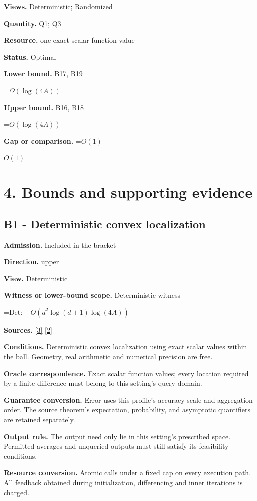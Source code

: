 \documentclass[10pt,a4paper]{article}
\newcommand{\AtlasMath}[1]{\par\begingroup\centering\setbox0=\hbox{$\displaystyle #1$}\ifdim\wd0>1.4\linewidth\typeout{ATLAS WIDE FORMULA: \the\wd0}\fi\ifdim\wd0>\linewidth\resizebox{\linewidth}{!}{\box0}\else\box0\fi\par\endgroup}
\newcommand{\AtlasInlineMath}[1]{\begingroup\setbox0=\hbox{$#1$}\ifdim\wd0>.4\linewidth\endgroup\AtlasMath{#1}\else\endgroup$#1$\fi}
\begin{document}
\textbf{Views.} Deterministic; Randomized

\textbf{Quantity.} Q1; Q3

\textbf{Resource.} one exact scalar function value

\textbf{Status.} Optimal

\textbf{Lower bound.} B17, B19

\AtlasMath{\Omega(\log(4A))}
\textbf{Upper bound.} B16, B18

\AtlasMath{O(\log(4A))}
\textbf{Gap or comparison.} \AtlasInlineMath{O(1)}

\section{4. Bounds and supporting evidence}
\subsection{B1 - Deterministic convex localization}
\textbf{Admission.} Included in the bracket

\textbf{Direction.} upper

\textbf{View.} Deterministic

\textbf{Witness or lower-bound scope.} Deterministic witness

\AtlasMath{\mathrm{Det}:\quad O(d^2\log(d+1)\log(4A))}
\textbf{Sources.} \href{https://arxiv.org/html/2607.16558v2}{[3]} \href{https://www.mathnet.ru/php/archive.phtml?jrnid=mzm&option_lang=eng&paperid=1697&wshow=paper}{[2]}

\textbf{Conditions.} Deterministic convex localization using exact scalar values within the ball. Geometry, real arithmetic and numerical precision are free.

\textbf{Oracle correspondence.} Exact scalar function values; every location required by a finite difference must belong to this setting's query domain.

\textbf{Guarantee conversion.} Error uses this profile's accuracy scale and aggregation order. The source theorem's expectation, probability, and asymptotic quantifiers are retained separately.

\textbf{Output rule.} The output need only lie in this setting's prescribed space. Permitted averages and unqueried outputs must still satisfy its feasibility conditions.

\textbf{Resource conversion.} Atomic calls under a fixed cap on every execution path. All feedback obtained during initialization, differencing and inner iterations is charged.
\end{document}
